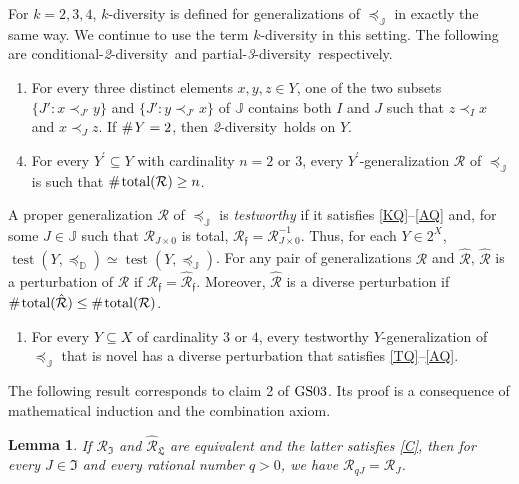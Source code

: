 \documentclass[ecta,nameyear,draft]{econsocart}
\newcommand{\test}{\operatorname{test}}
\newcommand{\countof}{\mathbin{\#}\hskip1pt}
\newcommand{\mc}{\mathcal}
\newcommand{\novel}{\mathfrak f}
\newcommand{\preceqb}{\mathbin{\preceq}}
\newcommand{\ext}{\mathrel{\mc R}}
\newcommand{\extb}{\mathbin{\mc R}}
\newcommand{\hext}{\mathrel{\hat{\mathrel{\mathcal R}}}}
\newcommand{\hextb}{\mathbin{\hat{\mathbin{\mathcal R}}}}
\newcommand{\total}{\textup{total}}
\newcommand{\mbbd}{{\mathds D}}
\newcommand{\mbbipp}{{\mathfrak L}}
\newcommand{\mbbj}{\mathds J}
\newcommand{\mbbjpp}{\mathfrak{I}}
\newcommand{\parthreediv}{\textup{partial-\textit{3}-diversity}}
\newcommand{\condtwodiv}{\textup{conditional-\textit{2}-diversity}}
\newcommand{\twodiv}{\textit{2}-\textup{diversity}}
\newcommand{\gsii}{$\textup{GS03}$}
\theoremstyle{plain}
\newtheorem{lemma}{Lemma}[theorem]
\theoremstyle{remark}
\begin{document}
\begin{appendix}
  For $k = 2, 3, 4$, $k$-diversity is defined for generalizations of
  $\preceq_{\mbbj}$ in exactly the same way. We continue to use the term
  $k$-diversity in this setting.  The following are \condtwodiv\ and
  \parthreediv\ respectively.
  \begin{enumerate}[label=\textup{A\arabic*}$^ \flat$,resume]
    \item\label{c2dQ} For every three distinct elements $x , y , z \in Y$, one
      of the two subsets $\{J': x \prec_{J'} y \}$ and $\{J': y \prec_{J'} x\}$
      of $\mbbj$ contains both $I$ and $J$ such that $z \prec _{I} x$ and $x
      \prec _{J} z$. If $\countof Y = 2$, then \twodiv\ holds on $Y$.
  \end{enumerate}
  \begin{enumerate}[label=\textup{A\arabic*}$^{'\flat}$,resume]
    \setcounter{enumi}{3}
    \item\label{p3dQ} For every $Y^{\prime} \subseteq Y$ with cardinality $n =
      2$ or $3$, every $Y^{\prime}$-generalization $\ext$ of $\preceq
      _{\mbbj}$ is such that $\countof{\total(\ext)} \geq n$.
  \end{enumerate}

  A proper generalization $\ext$ of $\preceqb _{\mbbj}$ is \emph{testworthy}
  if it satisfies \ref{KQ}--\ref{AQ} and, for some $J\in \mbbj$ such that
  $\ext_{J\times 0}$ is total, $\extb_{\novel} = \extb_{J\times 0}^{-1}$. Thus,
  for each $Y \in 2^{X}$, $\test ( Y , \preceqb _{\mbbd} ) \simeq \test ( Y ,
  \preceqb _{\mbbj })$. For any pair of generalizations $\ext$ and $\hext$,
  $\hext$ is a perturbation of $\ext$ if $\extb_{\novel} = \hextb_{\novel}$.
  Moreover, $\hext$ is a {{diverse}} perturbation if $\countof \total (\hext)
  \leq \countof \total (\ext)$.
  \begin{enumerate}[label=\textit{4}-\textup{P}$^{\flat}$]
    \item\label{PQ} For every $Y \subseteq X$ of cardinality $3$ or $4$, every
      testworthy $Y$-generalization of $\preceqb _{\mbbj}$ that is novel has
      a {{diverse}} perturbation that satisfies \ref{TQ}–\ref{AQ}.
  \end{enumerate}

  The following result corresponds to claim 2 of \gsii. Its proof is a
  consequence of mathematical induction and the combination axiom.
  \vskip-15pt
  \begin{lemma}\label{lem-coneQ} If $\ext _ \mbbjpp$ and $\hext _ \mbbipp$ are
    equivalent and the latter satisfies \ref{C}, then for every $J \in \mbbjpp$
    and every rational number $q >0$, we have $\extb _{q J}  =  \extb _{J}$.
  \end{lemma}


\end{appendix}
\end{document}
